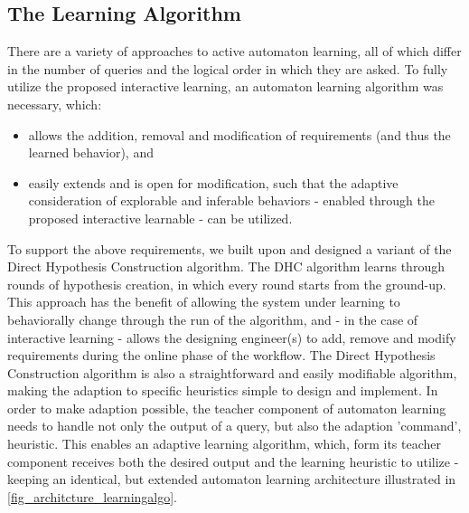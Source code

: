 \subsection{The Learning Algorithm} \label{subs_dhcintheframework}

There are a variety of approaches to active automaton learning, all of which differ in the number of queries and the logical order in which they are asked. To fully utilize the proposed interactive learning, an automaton learning algorithm was necessary, which:

\begin{itemize}
	\item allows the addition, removal and modification of requirements (and thus the learned behavior), and
	\item easily extends and is open for modification, such that the adaptive consideration of explorable and inferable behaviors - enabled through the proposed interactive learnable - can be utilized.
\end{itemize}

To support the above requirements, we built upon and designed a variant of the Direct Hypothesis Construction algorithm. The DHC algorithm learns through rounds of hypothesis creation, in which every round starts from the ground-up. This approach has the benefit of allowing the system under learning to behaviorally change through the run of the algorithm, and - in the case of interactive learning - allows the designing engineer(s) to add, remove and modify requirements during the online phase of the workflow. The Direct Hypothesis Construction algorithm is also a straightforward and easily modifiable algorithm, making the adaption to specific heuristics simple to design and implement. In order to make adaption possible, the teacher component of automaton learning needs to handle not only the output of a query, but also the adaption 'command', heuristic. This enables an adaptive learning algorithm, which, form its teacher component receives both the desired output and the learning heuristic to utilize - keeping an identical, but extended automaton learning architecture illustrated in \ref{fig_architcture_learningalgo}.

